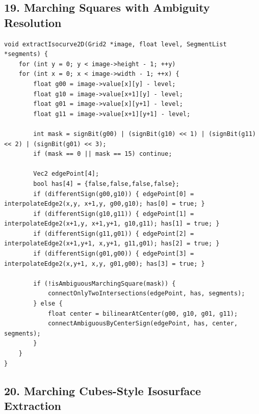\documentclass[10pt,letterpaper]{article}
\begin{document}
\subsection*{19. Marching Squares with Ambiguity Resolution}

\begin{verbatim}
void extractIsocurve2D(Grid2 *image, float level, SegmentList *segments) {
    for (int y = 0; y < image->height - 1; ++y)
    for (int x = 0; x < image->width - 1; ++x) {
        float g00 = image->value[x][y] - level;
        float g10 = image->value[x+1][y] - level;
        float g01 = image->value[x][y+1] - level;
        float g11 = image->value[x+1][y+1] - level;

        int mask = signBit(g00) | (signBit(g10) << 1) | (signBit(g11) << 2) | (signBit(g01) << 3);
        if (mask == 0 || mask == 15) continue;

        Vec2 edgePoint[4];
        bool has[4] = {false,false,false,false};
        if (differentSign(g00,g10)) { edgePoint[0] = interpolateEdge2(x,y, x+1,y, g00,g10); has[0] = true; }
        if (differentSign(g10,g11)) { edgePoint[1] = interpolateEdge2(x+1,y, x+1,y+1, g10,g11); has[1] = true; }
        if (differentSign(g11,g01)) { edgePoint[2] = interpolateEdge2(x+1,y+1, x,y+1, g11,g01); has[2] = true; }
        if (differentSign(g01,g00)) { edgePoint[3] = interpolateEdge2(x,y+1, x,y, g01,g00); has[3] = true; }

        if (!isAmbiguousMarchingSquare(mask)) {
            connectOnlyTwoIntersections(edgePoint, has, segments);
        } else {
            float center = bilinearAtCenter(g00, g10, g01, g11);
            connectAmbiguousByCenterSign(edgePoint, has, center, segments);
        }
    }
}
\end{verbatim}

\subsection*{20. Marching Cubes-Style Isosurface Extraction}
\end{document}
